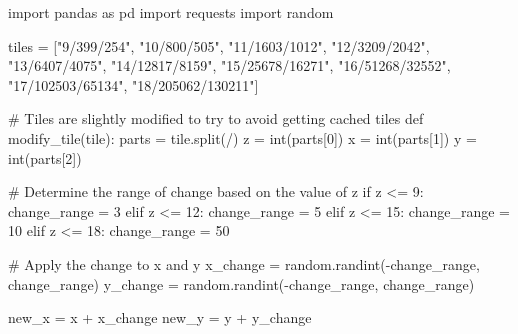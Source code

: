 \documentclass[
  oneside,
  open=any]{scrbook}
\newenvironment{Shaded}{\begin{snugshade}}{\end{snugshade}}
\newcommand{\BuiltInTok}[1]{\textcolor[rgb]{0.00,0.23,0.31}{#1}}
\newcommand{\CommentTok}[1]{\textcolor[rgb]{0.37,0.37,0.37}{#1}}
\newcommand{\ControlFlowTok}[1]{\textcolor[rgb]{0.00,0.23,0.31}{#1}}
\newcommand{\DecValTok}[1]{\textcolor[rgb]{0.68,0.00,0.00}{#1}}
\newcommand{\ImportTok}[1]{\textcolor[rgb]{0.00,0.46,0.62}{#1}}
\newcommand{\KeywordTok}[1]{\textcolor[rgb]{0.00,0.23,0.31}{#1}}
\newcommand{\NormalTok}[1]{\textcolor[rgb]{0.00,0.23,0.31}{#1}}
\newcommand{\OperatorTok}[1]{\textcolor[rgb]{0.37,0.37,0.37}{#1}}
\newcommand{\StringTok}[1]{\textcolor[rgb]{0.13,0.47,0.30}{#1}}
\begin{document}
\begin{Shaded}
\begin{Highlighting}[]
\ImportTok{import}\NormalTok{ pandas }\ImportTok{as}\NormalTok{ pd}
\ImportTok{import}\NormalTok{ requests}
\ImportTok{import}\NormalTok{ random}

\NormalTok{tiles }\OperatorTok{=}\NormalTok{ [}\StringTok{"9/399/254"}\NormalTok{, }\StringTok{"10/800/505"}\NormalTok{, }\StringTok{"11/1603/1012"}\NormalTok{,  }\StringTok{"12/3209/2042"}\NormalTok{, }
\StringTok{"13/6407/4075"}\NormalTok{, }\StringTok{"14/12817/8159"}\NormalTok{, }\StringTok{"15/25678/16271"}\NormalTok{, }\StringTok{"16/51268/32552"}\NormalTok{, }
\StringTok{"17/102503/65134"}\NormalTok{, }\StringTok{"18/205062/130211"}\NormalTok{]}

\CommentTok{\# Tiles are slightly modified to try to avoid getting cached tiles}
\KeywordTok{def}\NormalTok{ modify\_tile(tile):}
\NormalTok{    parts }\OperatorTok{=}\NormalTok{ tile.split(}\StringTok{\textquotesingle{}/\textquotesingle{}}\NormalTok{)}
\NormalTok{    z }\OperatorTok{=} \BuiltInTok{int}\NormalTok{(parts[}\DecValTok{0}\NormalTok{])}
\NormalTok{    x }\OperatorTok{=} \BuiltInTok{int}\NormalTok{(parts[}\DecValTok{1}\NormalTok{])}
\NormalTok{    y }\OperatorTok{=} \BuiltInTok{int}\NormalTok{(parts[}\DecValTok{2}\NormalTok{])}

    \CommentTok{\# Determine the range of change based on the value of z}
    \ControlFlowTok{if}\NormalTok{ z }\OperatorTok{\textless{}=} \DecValTok{9}\NormalTok{:}
\NormalTok{        change\_range }\OperatorTok{=} \DecValTok{3}
    \ControlFlowTok{elif}\NormalTok{ z }\OperatorTok{\textless{}=} \DecValTok{12}\NormalTok{:}
\NormalTok{        change\_range }\OperatorTok{=} \DecValTok{5}
    \ControlFlowTok{elif}\NormalTok{ z }\OperatorTok{\textless{}=} \DecValTok{15}\NormalTok{:}
\NormalTok{        change\_range }\OperatorTok{=} \DecValTok{10}
    \ControlFlowTok{elif}\NormalTok{ z }\OperatorTok{\textless{}=} \DecValTok{18}\NormalTok{:}
\NormalTok{        change\_range }\OperatorTok{=} \DecValTok{50}

    \CommentTok{\# Apply the change to x and y}
\NormalTok{    x\_change }\OperatorTok{=}\NormalTok{ random.randint(}\OperatorTok{{-}}\NormalTok{change\_range, change\_range)}
\NormalTok{    y\_change }\OperatorTok{=}\NormalTok{ random.randint(}\OperatorTok{{-}}\NormalTok{change\_range, change\_range)}

\NormalTok{    new\_x }\OperatorTok{=}\NormalTok{ x }\OperatorTok{+}\NormalTok{ x\_change}
\NormalTok{    new\_y }\OperatorTok{=}\NormalTok{ y }\OperatorTok{+}\NormalTok{ y\_change}


\end{Highlighting}
\end{Shaded}
\end{document}
